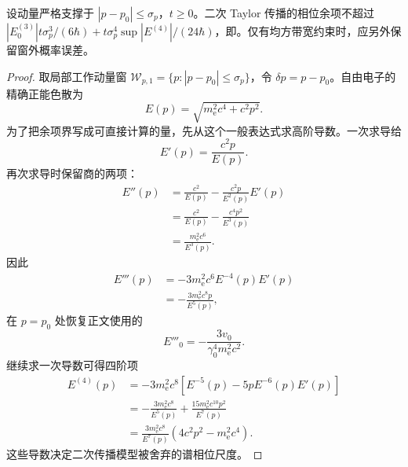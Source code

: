 \begin{proposition}[相对论色散的三阶相位控制]
设动量严格支撑于 $|p-p_0|\le\sigma_p$，$t\ge0$。二次 Taylor 传播的相位余项不超过 $|E^{(3)}_0|t\sigma_p^3/(6\hbar)+t\sigma_p^4\sup|E^{(4)}|/(24\hbar)$，即。仅有均方带宽约束时，应另外保留窗外概率误差。
\end{proposition}
\begin{proof}
取局部工作动量窗 $\mathcal W_{p,1}=\{p:|p-p_0|\le\sigma_p\}$，令 $\delta p=p-p_0$。自由电子的精确正能色散为
\[
E(p)=\sqrt{m_{\mathrm e}^2c^4+c^2p^2}.
\]
为了把余项界写成可直接计算的量，先从这个一般表达式求高阶导数。一次求导给
\[
E'(p)=\frac{c^2p}{E(p)}.
\]
再次求导时保留商的两项：
\begin{align*}
E''(p)
&=\frac{c^2}{E(p)}
-\frac{c^2p}{E^2(p)}E'(p)\\
&=\frac{c^2}{E(p)}-\frac{c^4p^2}{E^3(p)}\\
&=\frac{m_{\mathrm e}^2c^6}{E^3(p)}.
\end{align*}
因此
\begin{align*}
E'''(p)
&=-3m_{\mathrm e}^2c^6E^{-4}(p)E'(p)\\
&=-\frac{3m_{\mathrm e}^2c^8p}{E^5(p)},
\end{align*}
在 $p=p_0$ 处恢复正文使用的
\[
E'''_0=-\frac{3v_0}{\gamma_0^4m_{\mathrm e}^2c^2}.
\]
继续求一次导数可得四阶项
\begin{align*}
E^{(4)}(p)
&=-3m_{\mathrm e}^2c^8
\left[E^{-5}(p)-5pE^{-6}(p)E'(p)\right]\\
&=-\frac{3m_{\mathrm e}^2c^8}{E^5(p)}
+\frac{15m_{\mathrm e}^2c^{10}p^2}{E^7(p)}\\
&=\frac{3m_{\mathrm e}^2c^8}{E^7(p)}
\left(4c^2p^2-m_{\mathrm e}^2c^4\right).
\end{align*}
这些导数决定二次传播模型被舍弃的谱相位尺度。


\end{proof}

